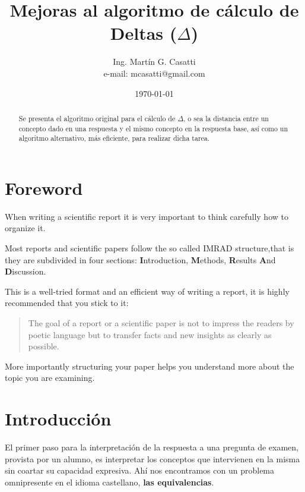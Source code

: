 \documentclass[a4paper,headsepline,footsepline,draft=false]{scrartcl}
\begin{document}
\title{Mejoras al algoritmo de cálculo de Deltas ($\Delta$)}
\author{Ing. Martín G. Casatti \\ e-mail: mcasatti@gmail.com}
\date{\today}
\maketitle
\thispagestyle{headings}

\begin{abstract}
	Se presenta el algoritmo original para el cálculo de $\Delta$, o sea la distancia entre un concepto dado en una respuesta y el mismo concepto en la respuesta base, así como un algoritmo alternativo, más eficiente, para realizar dicha tarea.
\end{abstract}

\ifdefined\borrador
\section*{Foreword}
When writing a scientific report it is very important to think carefully how to organize it.

Most reports and scientific papers follow the so called IMRAD structure,that is they are subdivided in four sections: \textbf{I}ntroduction, \textbf{M}ethods, \textbf{R}esults \textbf{A}nd \textbf{D}iscussion.

This is a well-tried format and an efficient way of writing a report, it is highly recommended that you stick to it: 

\begin{quote}
	The goal of a report or a scientific paper is not to impress the readers by poetic language but to transfer facts and new insights as clearly as possible.
\end{quote}

More importantly structuring your paper helps you understand more about the topic you are examining.
\fi

\section{Introducción}

El primer paso para la interpretación de la respuesta a una pregunta de examen, provista por un alumno, es interpretar los conceptos que intervienen en la misma sin coartar su capacidad expresiva. Ahí nos encontramos con un problema omnipresente en el idioma castellano, \textbf{las equivalencias}. 
\end{document}
